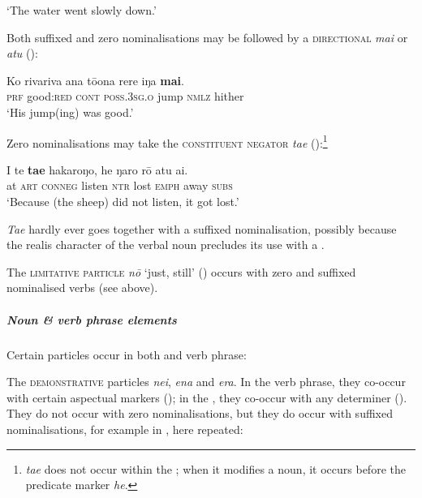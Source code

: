 \glt
‘The water went slowly down.’ \textstyleExampleref{[Gen. 8:5]}
\z

Both suffixed and zero nominalisations may be followed by a \textsc{directional} \textit{mai} or \textit{atu} ():

\ea\label{ex:3.53}
\gll Ko rivariva {\ꞌ}ana tō{\ꞌ}ona rere iŋa \textbf{mai}.\\
\textsc{prf} good:\textsc{red} \textsc{cont} \textsc{poss.3sg.o} jump \textsc{nmlz} hither\\

\glt
‘His jump(ing) was good.’ \textstyleExampleref{[R408.022]} 
\z

Zero nominalisations may take the \textsc{constituent negator} \textit{ta{\ꞌ}e} ():\footnote{\label{fn:112}\textit{ta{\ꞌ}e} does not occur within the ; when it modifies a noun, it occurs before the predicate marker \textit{he}.}

\ea\label{ex:3.54}
\gll {\ꞌ}I te \textbf{ta{\ꞌ}e} hakaroŋo, he ŋaro rō atu {\ꞌ}ai. \\
at \textsc{art} \textsc{conneg} listen \textsc{ntr} lost \textsc{emph} away \textsc{subs} \\

\glt
‘Because (the sheep) did not listen, it got lost.’ \textstyleExampleref{[R490.005]} 
\z

\textit{Ta{\ꞌ}e} hardly ever goes together with a suffixed nominalisation, possibly because the realis character of the verbal noun precludes its use with a .

The \textsc{limitative particle} \textit{nō} ‘just, still’ () occurs with zero and suffixed nominalised verbs (see  above).

\subparagraph{Noun \& verb phrase elements} Certain particles occur in both  and verb phrase:

The \textsc{demonstrative} particles \textit{nei}, \textit{ena} and \textit{era}. In the verb phrase, they co-occur with certain aspectual markers (); in the , they co-occur with any determiner (). They do not occur with zero  nominalisations, but they do occur with suffixed nominalisations, for example in , here repeated:

